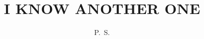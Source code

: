 


\raggedbottom


\title{I KNOW ANOTHER ONE}
\author[PENGK SYLVESTER]{P.~S.}
\publisher{}
\maketitle





